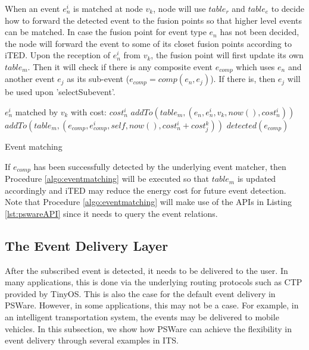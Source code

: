 When an event \(e_n^i\) is matched at node \(v_k\), node will use \(table_r\) and \(table_e\) to decide how to forward the detected event to the fusion points so that higher level events can be matched. In case the fusion point for event type \(e_n\) has not been decided, the node will forward the event to some of its closet fusion points  according to iTED. Upon the reception of \(e_n^i\) from \(v_k\), the fusion point will first update its own \(table_m\). Then it will check if there is any composite event \(e_{comp}\) which uses \(e_n\) and another event \(e_j\) as its sub-event (\(e_{comp}=comp(e_n, e_j)\)). If there is, then \(e_j\) will be used upon 'selectSubevent'.

\begin{algorithm}
\begin{algorithmic}
\REQUIRE \(e_n^i\) matched by \(v_k\) with cost: \(cost_n^i\)
	\STATE \(addTo(table_m, (e_n, e_n^i, v_k, now(), cost_n^i))\)
					\STATE \(addTo(table_m, (e_{comp}, e_{comp}^i, self, now(), cost_n^i+cost_j^k))\)
					\STATE \(detected(e_{comp})\)
				\ENDIF
			\ENDFOR
		\ENDIF
	\ENDFOR
\end{algorithmic}
\caption{Event matching}
\label{algo:eventmatching}
\end{algorithm}

If \(e_{comp}\) has been successfully detected by the underlying event matcher, then Procedure \ref{algo:eventmatching} will be executed so that \(table_m\) is updated accordingly and iTED may reduce the energy cost for future event detection. Note that Procedure \ref{algo:eventmatching} will make use of the APIs in Listing \ref{lst:pswareAPI} since it needs to query the event relations.

\subsection{The Event Delivery Layer}
After the subscribed event is detected, it needs to be delivered to the user. In many applications, this is done via the underlying routing protocols such as CTP provided by TinyOS. This is also the case for the default event delivery in PSWare. However, in some applications, this may not be a case. For example, in an intelligent transportation system, the events may be delivered to mobile vehicles. In this subsection, we show how PSWare can achieve the flexibility in event delivery through several examples in ITS.

